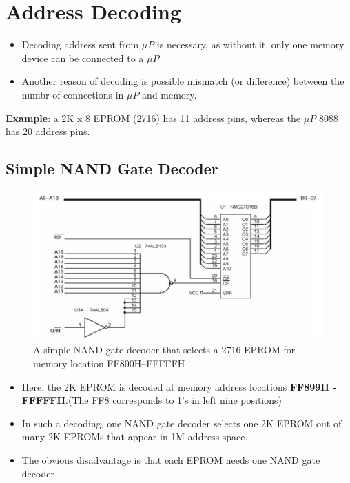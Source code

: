 \section{Address Decoding}
\begin{itemize}
  \item Decoding address sent from $\mu P$ is necessary, as without it, only one memory device can be connected to a $\mu P$
  \item Another reason of decoding is possible mismatch (or difference) between the numbr of connections in $\mu P$ and memory.

\end{itemize}
\textbf{Example}: a 2K x 8 EPROM (2716) has 11 address pins, whereas the $\mu P$ 8088 has 20 address pins.
\subsection{Simple NAND Gate Decoder}

\begin{figure}[h!]
  \centering
  \includegraphics[width = 1.0\textwidth]{./figures/NAND_decoder.png}
  \caption{A simple NAND gate decoder that selects a 2716 EPROM for memory location FF800H–FFFFFH}
  \label{}
\end{figure}
\begin{itemize}
  \item Here, the 2K EPROM is decoded at memory address locations \textbf{FF899H - FFFFFH}.(The FF8 corresponds to 1's in left nine positions)
  \item In such a decoding, one NAND gate decoder selects one 2K EPROM out of many 2K EPROMs that appear in 1M address space.
  \item The obvious disadvantage is that each EPROM needs one NAND gate decoder
\end{itemize}

